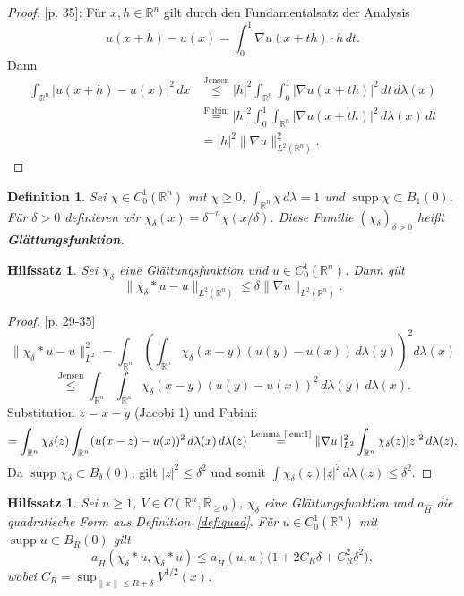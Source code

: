 \documentclass[11pt,a4paper,leqno]{report}
\newtheorem{lemma}[theorem]{Hilfssatz}
\newtheorem{definition}[theorem]{Definition}
\numberwithin{equation}{chapter}
\begin{document}
\begin{proof}\cite{Haslinger}[p. 35]:
	Für $x, h \in \mathbb{R}^n$ gilt durch den Fundamentalsatz der Analysis
	\[
	u(x + h) - u(x) = \int_0^1 \nabla u(x + t h) \cdot h \, dt.
	\]
	Dann
	\begin{align*}
		\int_{\mathbb{R}^n} |u(x + h) - u(x)|^2 \, dx
		&\overset{\text{Jensen}}{\leq} |h|^2 \int_{\mathbb{R}^n} \int_0^1 |\nabla u(x + t h)|^2 \, dt \, d\lambda(x) \\
		&\overset{\text{Fubini}}{=} |h|^2 \int_0^1 \int_{\mathbb{R}^n} |\nabla u(x + t h)|^2 \, d\lambda(x) \, dt \\
		&= |h|^2 \|\nabla u\|_{L^2(\mathbb{R}^n)}^2.
	\end{align*}
\end{proof}

\begin{definition}
	Sei $\chi \in C^1_0(\mathbb{R}^n)$ mit $\chi \geq 0$, $\int_{\mathbb{R}^n} \chi \, d\lambda = 1$ und $\operatorname{supp} \chi \subset B_1(0)$. 
	Für $\delta > 0$ definieren wir $\chi_\delta(x) = \delta^{-n} \chi(x/\delta)$. 
	Diese Familie $(\chi_\delta)_{\delta > 0}$ heißt \textbf{Glättungsfunktion}.
\end{definition}

\begin{lemma}\label{lem:2}
	Sei $\chi_\delta$ eine Glättungsfunktion und $u \in C^1_0(\mathbb{R}^n)$. Dann gilt
	\[
	\|\chi_\delta * u - u\|_{L^2(\mathbb{R}^n)} \leq \delta \|\nabla u\|_{L^2(\mathbb{R}^n)}.
	\]
\end{lemma}

\begin{proof}\cite{Haslinger} [p. 29-35] 
	\[
	\|\chi_\delta * u - u\|_{L^2}^2 = \int_{\mathbb{R}^n} \left( \int_{\mathbb{R}^n} \chi_\delta(x - y) (u(y) - u(x)) \, d\lambda(y) \right)^2 d\lambda(x)
	\]
	\[
	\overset{\text{Jensen}}{\leq} \int_{\mathbb{R}^n} \int_{\mathbb{R}^n} \chi_\delta(x - y) (u(y) - u(x))^2 \, d\lambda(y) \, d\lambda(x).
	\]
	Substitution $z = x - y$ (Jacobi 1) und Fubini:
	\[
	= \int_{\mathbb{R}^n} \chi_\delta(z) \int_{\mathbb{R}^n} (u(x - z) - u(x))^2 \, d\lambda(x) \, d\lambda(z)
	\overset{\text{Lemma~\ref{lem:1}}}{=} \|\nabla u\|_{L^2}^2 \int_{\mathbb{R}^n} \chi_\delta(z) |z|^2 \, d\lambda(z).
	\]
	Da $\operatorname{supp} \chi_\delta \subset B_\delta(0)$, gilt $|z|^2 \leq \delta^2$ und somit $\int \chi_\delta(z) |z|^2 \, d\lambda(z) \leq \delta^2$.
\end{proof}

\begin{lemma}\label{lem:3}
	Sei $n \geq 1$, $V \in C(\mathbb{R}^n, \mathbb{R}_{\geq 0})$, $\chi_\delta$ eine Glättungsfunktion und $a_{\hat{H}}$ die quadratische Form aus Definition~\ref{def:quad}. 
	Für $u \in C^1_0(\mathbb{R}^n)$ mit $\operatorname{supp} u \subset B_R(0)$ gilt
	\[
	a_{\hat{H}}(\chi_\delta * u, \chi_\delta * u) \leq a_{\hat{H}}(u,u) \bigl(1 + 2 C_R \delta + C_R^2 \delta^2\bigr),
	\]
	wobei $C_R = \sup_{\|x\| \leq R + \delta} V^{1/2}(x)$.
\end{lemma}
\end{document}
